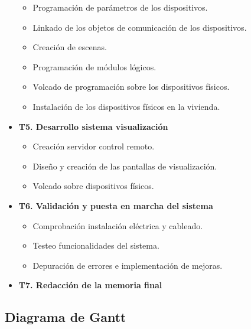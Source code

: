 \begin{itemize}
	\begin{itemize}
	\item Programación de parámetros de los dispositivos.
	\item Linkado de los objetos de comunicación de los dispositivos.
	\item Creación de escenas.
	\item Programación de módulos lógicos.
	\item Volcado de programación sobre los dispositivos físicos.
	\item Instalación de los dispositivos físicos en la vivienda. \\
	\end{itemize} 
\item \textbf{T5. Desarrollo sistema visualización}
	\begin{itemize}
	\item Creación servidor control remoto.
	\item Diseño y creación de las pantallas de visualización.
	\item Volcado sobre dispositivos físicos. \\
	\end{itemize} 
\item \textbf{T6. Validación y puesta en marcha del sistema}
	\begin{itemize}
	\item Comprobación instalación eléctrica y cableado.
	\item Testeo funcionalidades del sistema.
	\item Depuración de errores e implementación de mejoras. \\
	\end{itemize} 
\item \textbf{T7. Redacción de la memoria final} \\
\end{itemize} 

\subsection{Diagrama de Gantt}

